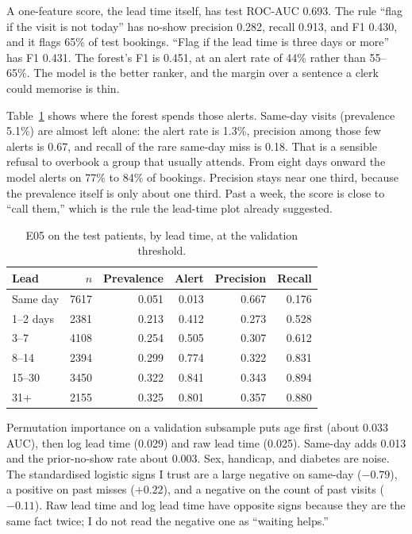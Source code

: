 \documentclass[conference]{IEEEtran}
\begin{document}
A one-feature score, the lead time itself, has test ROC-AUC 0.693. The rule ``flag if the visit is not today'' has no-show precision 0.282, recall 0.913, and F1 0.430, and it flags 65\% of test bookings. ``Flag if the lead time is three days or more'' has F1 0.431. The forest's F1 is 0.451, at an alert rate of 44\% rather than 55--65\%. The model is the better ranker, and the margin over a sentence a clerk could memorise is thin.

Table~\ref{tab:slice} shows where the forest spends those alerts. Same-day visits (prevalence 5.1\%) are almost left alone: the alert rate is 1.3\%, precision among those few alerts is 0.67, and recall of the rare same-day miss is 0.18. That is a sensible refusal to overbook a group that usually attends. From eight days onward the model alerts on 77\% to 84\% of bookings. Precision stays near one third, because the prevalence itself is only about one third. Past a week, the score is close to ``call them,'' which is the rule the lead-time plot already suggested.

\begin{table}[t]
\centering
\caption{E05 on the test patients, by lead time, at the validation threshold.}
\label{tab:slice}
\footnotesize
\begin{tabular}{lrrrrr}
\toprule
Lead & $n$ & Prevalence & Alert & Precision & Recall \\
\midrule
Same day & 7617 & 0.051 & 0.013 & 0.667 & 0.176 \\
1--2 days & 2381 & 0.213 & 0.412 & 0.273 & 0.528 \\
3--7 & 4108 & 0.254 & 0.505 & 0.307 & 0.612 \\
8--14 & 2394 & 0.299 & 0.774 & 0.322 & 0.831 \\
15--30 & 3450 & 0.322 & 0.841 & 0.343 & 0.894 \\
31+ & 2155 & 0.325 & 0.801 & 0.357 & 0.880 \\
\bottomrule
\end{tabular}
\end{table}

Permutation importance on a validation subsample puts age first (about 0.033 AUC), then log lead time (0.029) and raw lead time (0.025). Same-day adds 0.013 and the prior-no-show rate about 0.003. Sex, handicap, and diabetes are noise. The standardised logistic signs I trust are a large negative on same-day ($-0.79$), a positive on past misses ($+0.22$), and a negative on the count of past visits ($-0.11$). Raw lead time and log lead time have opposite signs because they are the same fact twice; I do not read the negative one as ``waiting helps.''
\end{document}

